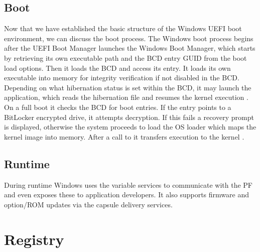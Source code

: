 \subsection{Boot}

Now that we have established the basic structure of the Windows \ac{UEFI} boot environment, we can discuss the boot process.
The Windows boot process begins after the \ac{UEFI} Boot Manager launches the Windows Boot Manager, which starts by retrieving its own executable path and the \ac{BCD} entry \ac{GUID} from the boot load options.
Then it loads the \ac{BCD} and access its entry.
It loads its own executable into memory for integrity verification \cite[Section 12]{windows-internals-7-part2} if not disabled in the \ac{BCD}.
Depending on what hibernation status is set within the \ac{BCD}, it may launch the  application, which reads the hibernation file and resumes the kernel execution \cite[Section 12]{windows-internals-7-part2}.
On a full boot it checks the \ac{BCD} for boot entries.
If the entry points to a BitLocker encrypted drive, it attempts decryption.
If this fails a recovery prompt is displayed, otherwise the system proceeds to load the \ac{OS} loader  which maps the kernel image  into memory. After a call to  it transfers execution to the kernel \cite[Section 12]{windows-internals-7-part2}.

\subsection{Runtime}

During runtime Windows uses the variable services to communicate with the \ac{PF} and even exposes these to application developers.
It also supports firmware and option\-/\ac{ROM} updates via the capsule delivery services.

\section{Registry}

